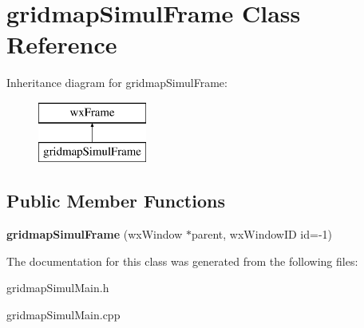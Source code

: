 \hypertarget{classgridmapSimulFrame}{}\section{gridmap\+Simul\+Frame Class Reference}
\label{classgridmapSimulFrame}
Inheritance diagram for gridmap\+Simul\+Frame\+:\begin{figure}[H]
\begin{center}
\leavevmode
\includegraphics[height=2.000000cm]{classgridmapSimulFrame}
\end{center}
\end{figure}
\subsection*{Public Member Functions}
\begin{DoxyCompactItemize}
\item 
\mbox{\label{classgridmapSimulFrame_ac1ac89ea6a9a31594031b1555124e9de}} 
{\bfseries gridmap\+Simul\+Frame} (wx\+Window $\ast$parent, wx\+Window\+ID id=-\/1)
\end{DoxyCompactItemize}


The documentation for this class was generated from the following files\+:\begin{DoxyCompactItemize}
\item 
gridmap\+Simul\+Main.\+h\item 
gridmap\+Simul\+Main.\+cpp\end{DoxyCompactItemize}
